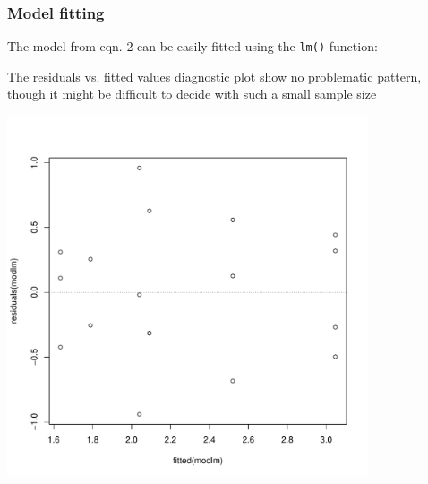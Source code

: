 \subsubsection{Model fitting}
The model from eqn. 2 can be easily fitted using the \texttt{lm()} function:

\begin{knitrout}
\color{fgcolor}\small\begin{kframe}
\begin{alltt}
 \hlkwb{<-}  \hlopt{~}   
\end{alltt}
\end{kframe}
\end{knitrout}

The residuals vs. fitted values diagnostic plot show no problematic pattern, though it might be difficult to decide with such a small sample size
\begin{knitrout}
\color{fgcolor}\small\begin{kframe}
\begin{alltt}
\hlstd{(} \hlopt{~} 
\hlstd{(} \hlstd{=} \hlstd{,}  \hlstd{=} \hlstd{)}
\end{alltt}
\end{kframe}

{\centering \includegraphics[width=0.8\textwidth]{appendix/usetheglm/two/plot_modlm-1} 

}



\end{knitrout}

